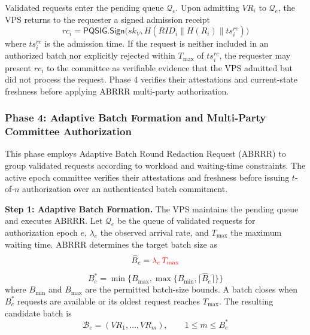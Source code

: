 \documentclass[lettersize,journal]{IEEEtran}
\begin{document}
    Validated requests enter the pending queue
    $\mathcal{Q}_e$.  {Upon admitting $VR_i$ to
    $\mathcal{Q}_e$, the VPS returns to the requester a signed admission
    receipt
    \begin{equation}
    rc_i=\mathsf{PQSIG.Sign}\big(sk_V,H(RID_i\parallel H(R_i)\parallel ts_i^{rc})\big)
    \end{equation}
    where $ts_i^{rc}$ is the admission time. If the request is neither
    included in an authorized batch nor explicitly rejected within
    $T_{\max}$ of $ts_i^{rc}$, the requester may present $rc_i$ to the
    committee as verifiable evidence that the VPS admitted but did not
    process the request.} Phase 4 verifies their
    attestations and current-state freshness
    before applying ABRRR multi-party
    authorization.
    
    
    
    
    \subsubsection*{\textbf{Phase 4: Adaptive Batch Formation
    and Multi-Party Committee Authorization}}
    
    This phase employs Adaptive Batch Round Redaction
    Request (ABRRR) to group validated requests according
    to workload and waiting-time constraints. The active
    epoch committee verifies their attestations and
    freshness before issuing $t$-of-$n$ authorization
    over an authenticated batch commitment.
    
    \medskip
    \noindent\textbf{Step 1: Adaptive Batch Formation.}
     {The VPS maintains the pending queue and executes ABRRR.}
    Let $\mathcal{Q}_e$ be the queue of validated requests
    for authorization epoch $e$, $\lambda_e$ the observed
    arrival rate, and $T_{\max}$ the maximum waiting time.
    ABRRR determines the target batch size as
    \begin{equation}
    \widehat{B}_e
    =\textcolor{red}{\lambda_e\,T_{\max}}
    \end{equation}
    \begin{equation}
    B_e^{*}
    =\min\{B_{\max} {,}
    \max\{B_{\min},\lceil\widehat{B}_e\rceil\}\}
    \end{equation}
    where $B_{\min}$ and $B_{\max}$ are the permitted
    batch-size bounds. A batch closes when $B_e^{*}$
    requests are available or its oldest request reaches
    $T_{\max}$. The resulting candidate batch is
    \begin{equation}
    \mathcal{B}_e=
    (VR_1,\ldots,VR_m),
    \qquad 1\leq m\leq B_e^{*}
    \end{equation}
    
\end{document}
